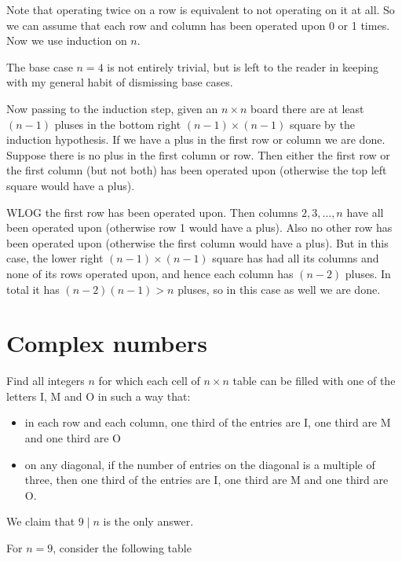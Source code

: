 \sol Note that operating twice on a row is equivalent to not operating on it at all. So we can assume that each row and column has been operated upon 0 or 1 times. Now we use induction on $n$.

The base case $n=4$ is not entirely trivial, but is left to the reader in keeping with my general habit of dismissing base cases.

Now passing to the induction step, given an $n\times n$ board there are at least $(n-1)$ pluses in the bottom right $(n-1)\times (n-1)$ square by the induction hypothesis. If we have a plus in the first row or column we are done. Suppose there is no plus in the first column or row. Then either the first row or the first column (but not both) has been operated upon (otherwise the top left square would have a plus).

WLOG the first row has been operated upon. Then columns $2, 3, \dots, n$ have all been operated upon (otherwise row 1 would have a plus). Also no other row has been operated upon (otherwise the first column would have a plus). But in this case, the lower right $(n-1)\times (n-1)$ square has had all its columns and none of its rows operated upon, and hence each column has $(n-2)$ pluses. In total it has $(n-2)(n-1) > n$ pluses, so in this case as well we are done.

\newpage

\section{Complex numbers}

\begin{example} [IMO 2016]
    Find all integers $n$ for which each cell of $n\times n$ table can be filled with one of the letters I, M and O in such a way that:
    \begin{itemize}
        \item in each row and each column, one third of the entries are I, one third are M and one third are O
        \item on any diagonal, if the number of entries on the diagonal is a multiple of three, then one third of the entries are I, one third are M and one third are O.
    \end{itemize}
\end{example}

We claim that $9\mid n$ is the only answer.

For $n=9$, consider the following table


